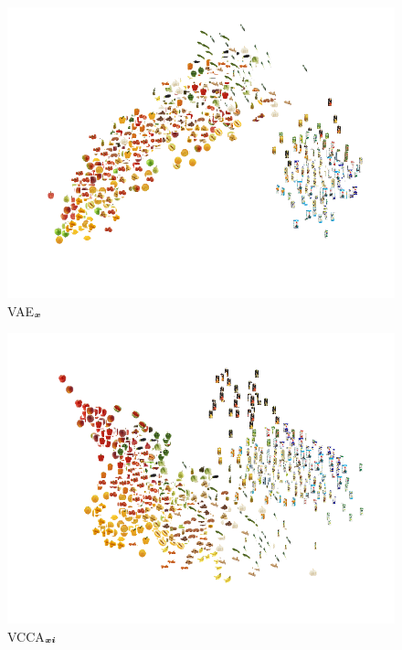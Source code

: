 
\begin{subfigure}[b]{0.3\textwidth}
	\centering
	\includegraphics[width=\textwidth]{Chapter1/pics_paperB/pca_latents_vae_seed2}
	\vspace{-8mm}
	\caption{VAE$_{{\bm{x}}}$}
	\label{fig:pca_latents_vae}
\end{subfigure}
\hfill
\begin{subfigure}[b]{0.3\textwidth}
	\centering
	\includegraphics[width=\textwidth]{Chapter1/pics_paperB/pca_latents_vcca_xi_seed2}
	\vspace{-8mm}
	\caption{VCCA$_{{\bm{x}}{\bm{i}}}$}
\label{fig:pca_latents_vcca_xi}
\end{subfigure}
\hfill

